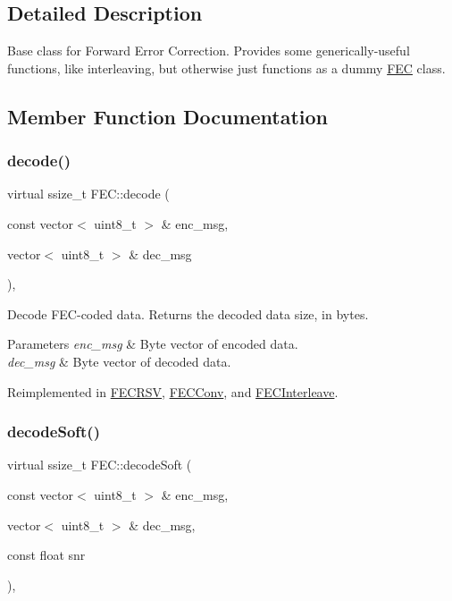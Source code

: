 \subsection{Detailed Description}
Base class for Forward Error Correction. Provides some generically-\/useful functions, like interleaving, but otherwise just functions as a dummy \hyperlink{classFEC}{F\+EC} class. 

\subsection{Member Function Documentation}
\mbox{\label{classFEC_aec87f2d9c2305283d226197bf76891cf}} 
\subsubsection{\texorpdfstring{decode()}{decode()}}
{\footnotesize\ttfamily virtual ssize\+\_\+t F\+E\+C\+::decode (\begin{DoxyParamCaption}\item[{const vector$<$ uint8\+\_\+t $>$ \&}]{enc\+\_\+msg,  }\item[{vector$<$ uint8\+\_\+t $>$ \&}]{dec\+\_\+msg }\end{DoxyParamCaption})\hspace{0.3cm}{\ttfamily [inline]}, {\ttfamily [virtual]}}

Decode F\+E\+C-\/coded data. Returns the decoded data size, in bytes. 
\begin{DoxyParams}{Parameters}
{\em enc\+\_\+msg} & Byte vector of encoded data. \\
\hline
{\em dec\+\_\+msg} & Byte vector of decoded data. \\
\hline
\end{DoxyParams}


Reimplemented in \hyperlink{classFECRSV_a4781900bd59579d7a380687c59179ae5}{F\+E\+C\+R\+SV}, \hyperlink{classFECConv_afd897d6756bbbe4874942654e91a95e3}{F\+E\+C\+Conv}, and \hyperlink{classFECInterleave_a7e45a890ff7061e0a5c3234d29ac8954}{F\+E\+C\+Interleave}.

\mbox{\label{classFEC_a04ba63e1dac24bed00f448f9198e34b5}} 
\subsubsection{\texorpdfstring{decode\+Soft()}{decodeSoft()}}
{\footnotesize\ttfamily virtual ssize\+\_\+t F\+E\+C\+::decode\+Soft (\begin{DoxyParamCaption}\item[{const vector$<$ uint8\+\_\+t $>$ \&}]{enc\+\_\+msg,  }\item[{vector$<$ uint8\+\_\+t $>$ \&}]{dec\+\_\+msg,  }\item[{const float}]{snr }\end{DoxyParamCaption})\hspace{0.3cm}{\ttfamily [inline]}, {\ttfamily [virtual]}}


